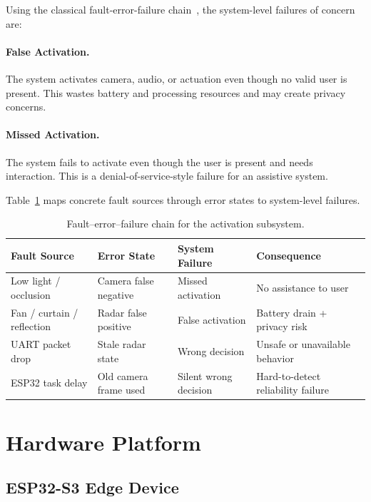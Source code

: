 \documentclass[12pt]{extarticle}
\begin{document}
Using the classical fault-error-failure chain~\cite{avizienis2004}, the system-level
failures of concern are:

\paragraph{False Activation.}
The system activates camera, audio, or actuation even though no valid user is present.
This wastes battery and processing resources and may create privacy concerns.

\paragraph{Missed Activation.}
The system fails to activate even though the user is present and needs interaction.
This is a denial-of-service-style failure for an assistive system.

Table~\ref{tab:failure_chain} maps concrete fault sources through error states to
system-level failures.

\begin{table}[H]
\centering
\caption{Fault--error--failure chain for the activation subsystem.}
\label{tab:failure_chain}
\small
\begin{tabular}{p{3.2cm}p{3.2cm}p{3.0cm}p{3.2cm}}
\toprule
\textbf{Fault Source} & \textbf{Error State} & \textbf{System Failure} & \textbf{Consequence}\\
\midrule
Low light / occlusion & Camera false negative & Missed activation & No assistance to user\\
Fan / curtain / reflection & Radar false positive & False activation & Battery drain + privacy risk\\
UART packet drop & Stale radar state & Wrong decision & Unsafe or unavailable behavior\\
ESP32 task delay & Old camera frame used & Silent wrong decision & Hard-to-detect reliability failure\\
\bottomrule
\end{tabular}
\end{table}

\section{Hardware Platform}
\label{sec:platform}

\subsection{ESP32-S3 Edge Device}
\end{document}
